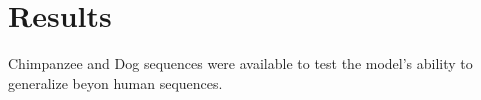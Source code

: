 \section{Results}
Chimpanzee and Dog sequences were available to test the model's ability to generalize beyon human sequences.